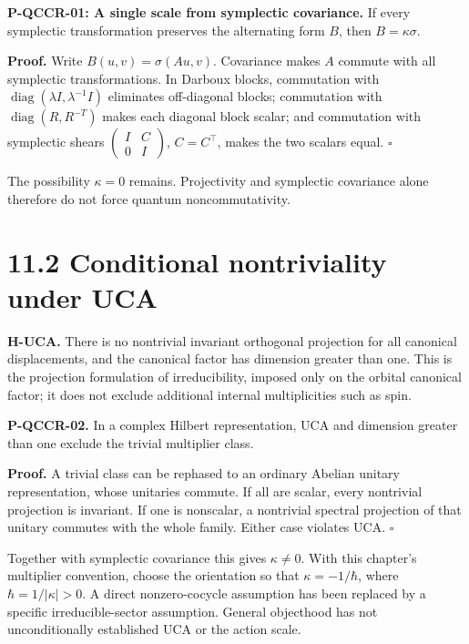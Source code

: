 \documentclass[
  11pt,
  oneside]{book}
\begin{document}
\label{p-qccr-01}{}

\textbf{P-QCCR-01: A single scale from symplectic covariance.} If every
symplectic transformation preserves the alternating form \(B\), then
\(B=\kappa\sigma\).

\textbf{Proof.} Write \(B(u,v)=\sigma(Au,v)\). Covariance makes \(A\)
commute with all symplectic transformations. In Darboux blocks,
commutation with \(\operatorname{diag}(\lambda I,\lambda^{-1}I)\)
eliminates off-diagonal blocks; commutation with
\(\operatorname{diag}(R,R^{-T})\) makes each diagonal block scalar; and
commutation with symplectic shears
\(\left(\begin{smallmatrix}I&C\\0&I\end{smallmatrix}\right)\),
\(C=C^\top\), makes the two scalars equal. \(\square\)

The possibility \(\kappa=0\) remains. Projectivity and symplectic
covariance alone therefore do not force quantum noncommutativity.

\section{11.2 Conditional nontriviality under UCA}

\textbf{H-UCA.} There is no nontrivial invariant orthogonal projection
for all canonical displacements, and the canonical factor has dimension
greater than one. This is the projection formulation of irreducibility,
imposed only on the orbital canonical factor; it does not exclude
additional internal multiplicities such as spin.

\label{p-qccr-02}{}

\textbf{P-QCCR-02.} In a complex Hilbert representation, UCA and
dimension greater than one exclude the trivial multiplier class.

\textbf{Proof.} A trivial class can be rephased to an ordinary Abelian
unitary representation, whose unitaries commute. If all are scalar,
every nontrivial projection is invariant. If one is nonscalar, a
nontrivial spectral projection of that unitary commutes with the whole
family. Either case violates UCA. \(\square\)

Together with symplectic covariance this gives \(\kappa\ne0\). With this
chapter's multiplier convention, choose the orientation so that
\(\kappa=-1/\hbar\), where \(\hbar=1/|\kappa|>0\). A direct
nonzero-cocycle assumption has been replaced by a specific
irreducible-sector assumption. General objecthood has not
unconditionally established UCA or the action scale.
\end{document}
